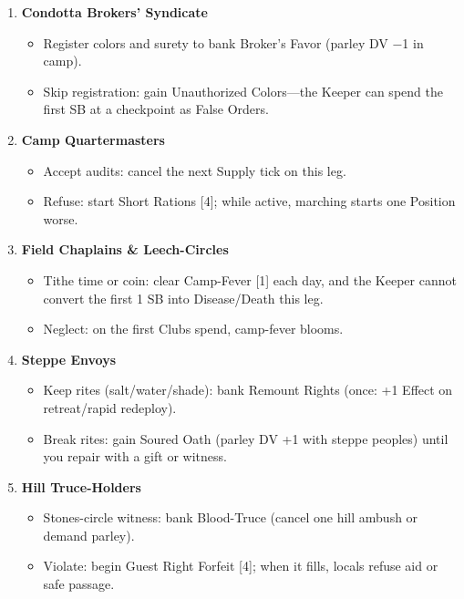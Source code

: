 \documentclass[11pt]{article}
\begin{document}
\begin{enumerate}
    \item \textbf{Condotta Brokers' Syndicate}
    \begin{itemize}
        \item Register colors and surety to bank Broker's Favor (parley DV −1 in camp).
        \item Skip registration: gain Unauthorized Colors---the Keeper can spend the first SB at a checkpoint as False Orders.
    \end{itemize}
    
    \item \textbf{Camp Quartermasters}
    \begin{itemize}
        \item Accept audits: cancel the next Supply tick on this leg.
        \item Refuse: start Short Rations [4]; while active, marching starts one Position worse.
    \end{itemize}
    
    \item \textbf{Field Chaplains \& Leech-Circles}
    \begin{itemize}
        \item Tithe time or coin: clear Camp-Fever [1] each day, and the Keeper cannot convert the first 1 SB into Disease/Death this leg.
        \item Neglect: on the first Clubs spend, camp-fever blooms.
    \end{itemize}
    
    \item \textbf{Steppe Envoys}
    \begin{itemize}
        \item Keep rites (salt/water/shade): bank Remount Rights (once: +1 Effect on retreat/rapid redeploy).
        \item Break rites: gain Soured Oath (parley DV +1 with steppe peoples) until you repair with a gift or witness.
    \end{itemize}
    
    \item \textbf{Hill Truce-Holders}
    \begin{itemize}
        \item Stones-circle witness: bank Blood-Truce (cancel one hill ambush or demand parley).
        \item Violate: begin Guest Right Forfeit [4]; when it fills, locals refuse aid or safe passage.
    \end{itemize}
\end{enumerate}
\end{document}
